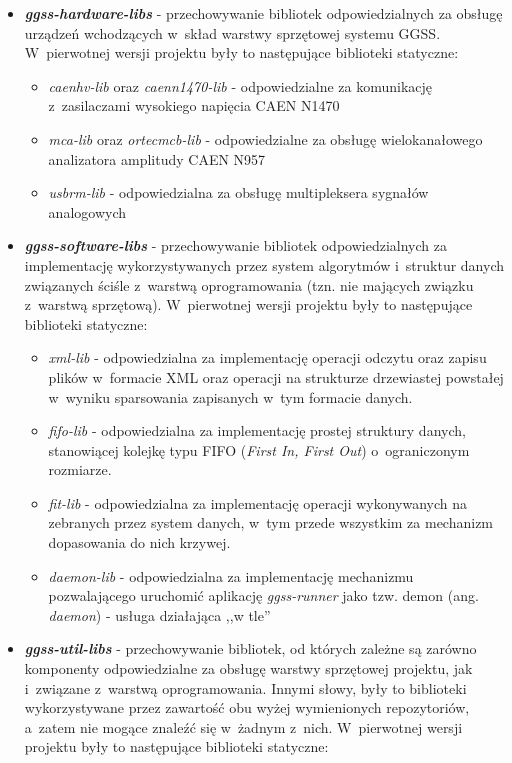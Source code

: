 \begin{itemize}
    \item \textbf{\emph{ggss-hardware-libs}} - przechowywanie bibliotek odpowiedzialnych za obsługę urządzeń wchodzących w~skład warstwy sprzętowej systemu GGSS. W~pierwotnej wersji projektu były to następujące biblioteki statyczne:
    \begin{itemize}
        \item \emph{caenhv-lib} oraz \emph{caenn1470-lib} - odpowiedzialne za komunikację z~zasilaczami wysokiego napięcia CAEN N1470
        \item \emph{mca-lib} oraz \emph{ortecmcb-lib} - odpowiedzialne za obsługę wielokanałowego analizatora amplitudy CAEN N957
        \item \emph{usbrm-lib} - odpowiedzialna za obsługę multipleksera sygnałów analogowych
    \end{itemize}
    \item \textbf{\emph{ggss-software-libs}} - przechowywanie bibliotek odpowiedzialnych za implementację wykorzystywanych przez system algorytmów i~struktur danych związanych ściśle z~warstwą oprogramowania (tzn. nie mających związku z~warstwą sprzętową). W~pierwotnej wersji projektu były to następujące biblioteki statyczne:
    \begin{itemize}
        \item \emph{xml-lib} - odpowiedzialna za implementację operacji odczytu oraz zapisu plików w~formacie XML oraz operacji na strukturze drzewiastej powstałej w~wyniku sparsowania zapisanych w~tym formacie danych.
        \item \emph{fifo-lib} - odpowiedzialna za implementację prostej struktury danych, stanowiącej kolejkę typu FIFO (\emph{First In, First Out}) o~ograniczonym rozmiarze.
        \item \emph{fit-lib} - odpowiedzialna za implementację operacji wykonywanych na zebranych przez system danych, w~tym przede wszystkim za mechanizm dopasowania do nich krzywej.
        \item \emph{daemon-lib} - odpowiedzialna za implementację mechanizmu pozwalającego uruchomić aplikację \emph{ggss-runner} jako tzw. demon (ang. \emph{daemon}) - usługa działająca ,,w tle''
    \end{itemize}
    \item \textbf{\emph{ggss-util-libs}} - przechowywanie bibliotek, od których zależne są zarówno komponenty odpowiedzialne za obsługę warstwy sprzętowej projektu, jak i~związane z~warstwą oprogramowania. Innymi słowy, były to biblioteki wykorzystywane przez zawartość obu wyżej wymienionych repozytoriów, a~zatem nie mogące znaleźć się w~żadnym z~nich. W~pierwotnej wersji projektu były to następujące biblioteki statyczne:

\end{itemize}
